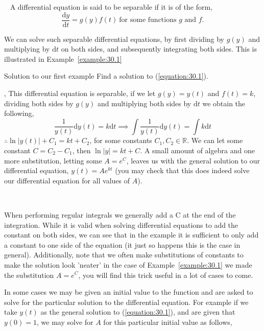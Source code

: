 \begin{definition}{~}
A differential equation is said to be separable if it is of the form,
$$\frac{\mathrm{d}y}{\mathrm{d}t}=g(y)f(t) \ \text{for some functions $g$ and $f$.}$$
\end{definition}

We can solve such separable differential equations, by first dividing by $g(y)$ and multiplying by $\mathrm{d}t$ on both sides, and subsequently integrating both sides. This is illustrated in Example~\ref{example:30.1}

\begin{example}{Solution to our first example}\label{example:30.1}
Find a solution to (\ref{equation:30.1}).

\sep
This differential equation is separable, if we let $g(y)=y(t)$ and $f(t)=k$, dividing both sides by $g(y)$ and multiplying both sides by $\mathrm{d}t$ we obtain the following,
$$\frac{1}{y(t)}\mathrm{d}y(t)=k\mathrm{d}t \implies \int\frac{1}{y(t)}\mathrm{d}y(t)=\int k \mathrm{d}t$$
$\therefore \ln{|y(t)|}+C_{1}=kt+C_{2}$, for some constants $C_{1},C_{2} \in \mathbb{R}$. We can let some constant $C=C_{2}-C_{1}$, then $\ln{|y|}=kt+C$. A small amount of algebra and one more substitution, letting some $A=e^C$, leaves us with the general solution to our differential equation, $y(t)=Ae^{kt}$ (you may check that this does indeed solve our differential equation for all values of $A$).
\end{example}

\begin{insight}{~}

When performing regular integrals we generally add a C at the end of the integration. While it is valid when solving differential equations to add the constant on both sides, we can see that in the example it is sufficient to only add a constant to one side of the equation (it just so happens this is the case in general). Additionally, note that we often make substitutions of constants to make the solution look 'neater' in the case of Example~\ref{example:30.1} we made the substitution $A=e^C$, you will find this trick useful in a lot of cases to come.

\end{insight}

In some cases we may be given an initial value to the function and are asked to solve for the particular solution to the differential equation. For example if we take $y(t)$ as the general solution to (\ref{equation:30.1}), and are given that $y(0)=1$, we may solve for $A$ for this particular initial value as follows,

